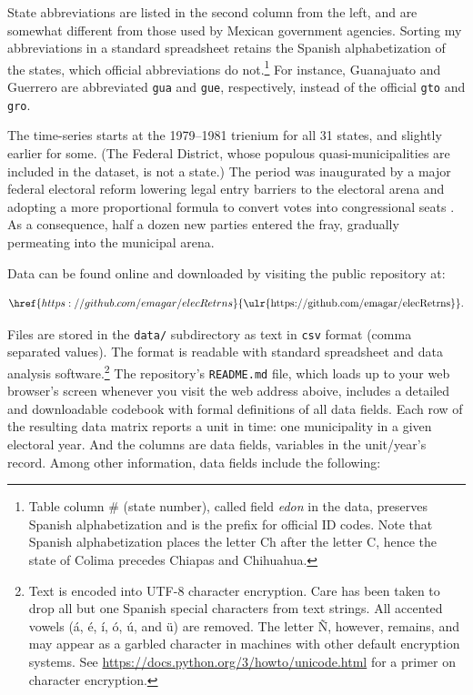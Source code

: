 \documentclass[letter,12pt]{article}
\begin{document}
State abbreviations are listed in the second column from the left, and are somewhat different from those used by Mexican government agencies. Sorting my abbreviations in a standard spreadsheet retains the Spanish alphabetization of the states, which official abbreviations do not.\footnote{Table column \# (state number), called field \emph{edon} in the data, preserves Spanish alphabetization and is the prefix for official ID codes. Note that Spanish alphabetization places the letter Ch after the letter C, hence the state of Colima precedes Chiapas and Chihuahua.} For instance, Guanajuato and Guerrero are abbreviated \verb|gua| and \verb|gue|, respectively, instead of the official \verb|gto| and \verb|gro|.

The time-series starts at the 1979--1981 trienium for all 31 states, and slightly earlier for some. (The Federal District, whose populous quasi-municipalities are included in the dataset, is not a state.) The period was inaugurated by a major federal electoral reform lowering legal entry barriers to the electoral arena and adopting a more proportional formula to convert votes into congressional seats \citep[:116]{molinar.1991a}. As a consequence, half a dozen new parties entered the fray, gradually permeating into the municipal arena.  

Data can be found online and downloaded by visiting the public repository at:

\begin{equation*}
\href{https://github.com/emagar/elecRetrns}{\text{\ulr{https://github.com/emagar/elecRetrns}}}.
\end{equation*}

\noindent Files are stored in the \verb|data/| subdirectory as text in \verb|csv| format (comma separated values). The format is readable with standard spreadsheet and data analysis software.\footnote{Text is encoded into UTF-8 character encryption. Care has been taken to drop all but one Spanish special characters from text strings. All accented vowels (á, é, í, ó, ú, and ü) are removed. The letter \~N, however, remains, and may appear as a garbled character in machines with other default encryption systems. See \url{https://docs.python.org/3/howto/unicode.html} for a primer on character encryption.} The repository's \verb|README.md| file, which loads up to your web browser's screen whenever you visit the web address aboive, includes a detailed and downloadable codebook with formal definitions of all data fields. Each row of the resulting data matrix reports a unit in time: one municipality in a given electoral year. And the columns are data fields, variables in the unit/year's record. Among other information, data fields include the following:
\end{document}
